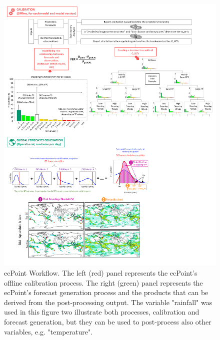 \documentclass[twocol]{ametsocV5} %
\begin{document}
\begin{figure}
\centerline{\includegraphics[width=53pc]{manuscript/Figures/ecPoint_Methodology.png}}
\caption{ecPoint Workflow. The left (red) panel represents the ecPoint's offline calibration process. The right (green) panel represents the ecPoint's forecast generation process and the products that can be derived from the post-processing output. The variable "rainfall" was used in this figure two illustrate both processes, calibration and forecast generation, but they can be used to post-process also other variables, e.g. "temperature".}
\label{ecPoint_Methodology}
\end{figure}
\end{document}
